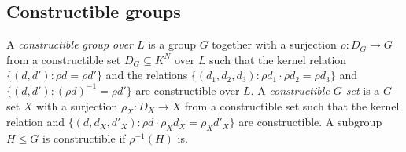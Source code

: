 \subsection{Constructible groups}

\begin{definition}\label{def:constructible-group}
A \emph{constructible group over $L$} is a group $G$ together with a surjection
$\rho:D_G\to G$ from a constructible set $D_G\subseteq K^N$ over $L$ such that the kernel
relation $\{(d,d'):\rho d=\rho d'\}$ and the relations
$\{(d_1,d_2,d_3):\rho d_1\cdot\rho d_2=\rho d_3\}$ and $\{(d,d'):(\rho d)^{-1}=\rho d'\}$ are
constructible over $L$.  A \emph{constructible $G$-set} is a $G$-set $X$ with a
surjection $\rho_X:D_X\to X$ from a constructible set such that the kernel relation and
$\{(d,d_X,d'_X):\rho d\cdot\rho_Xd_X=\rho_Xd'_X\}$ are constructible.  A subgroup $H\le G$
is constructible if $\rho^{-1}(H)$ is.
\end{definition}

